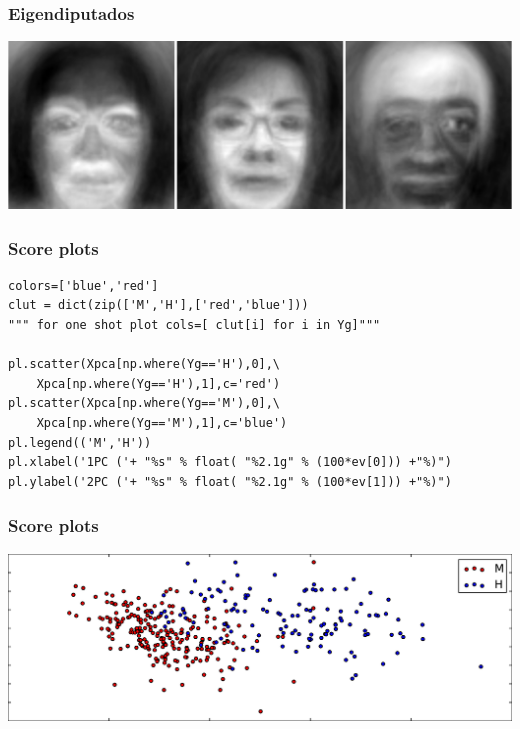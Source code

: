 \documentclass[10pt, colorlinks]{beamer}
\begin{document}
\begin{frame}[fragile]\frametitle{Eigendiputados}
\includegraphics[width=\textwidth]{plwfigis/CursP_4_figure28}

\end{frame}

\begin{frame}[fragile]\frametitle{Score plots}
\begin{verbatim}
colors=['blue','red']
clut = dict(zip(['M','H'],['red','blue']))
""" for one shot plot cols=[ clut[i] for i in Yg]"""

pl.scatter(Xpca[np.where(Yg=='H'),0],\
    Xpca[np.where(Yg=='H'),1],c='red')
pl.scatter(Xpca[np.where(Yg=='M'),0],\
    Xpca[np.where(Yg=='M'),1],c='blue')
pl.legend(('M','H'))
pl.xlabel('1PC ('+ "%s" % float( "%2.1g" % (100*ev[0])) +"%)")
pl.ylabel('2PC ('+ "%s" % float( "%2.1g" % (100*ev[1])) +"%)")
\end{verbatim}

\end{frame}
\begin{frame}[fragile]\frametitle{Score plots}
\includegraphics[width=\textwidth]{plwfigis/CursP_4_figure30}

\end{frame}
\end{document}
